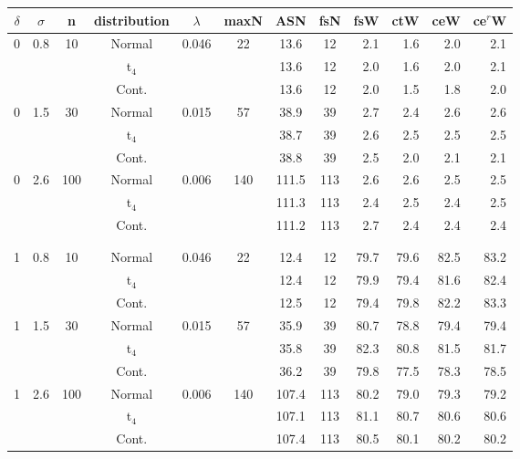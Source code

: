 \begin{tabular}{ccccccccrrrr}

\toprule
\multicolumn{1}{c}{$\delta$}&\multicolumn{1}{c}{$\sigma$}&\multicolumn{1}{c}{n}&\multicolumn{1}{c}{distribution}&\multicolumn{1}{c}{$\lambda$}&\multicolumn{1}{c}{maxN}&\multicolumn{1}{c}{ASN}&\multicolumn{1}{c}{fsN}&\multicolumn{1}{r}{fsW}&\multicolumn{1}{r}{ctW}&\multicolumn{1}{r}{ceW}&\multicolumn{1}{r}{ce$^r$W}\\
\midrule
0  &  0.8  &   10  &  Normal  &  0.046  &   22  &  13.6  &   12  &  2.1  &  1.6  &  2.0  &  2.1\\
   &     &     &  t$_4$  &     &     &  13.6  &   12  &  2.0  &  1.6  &  2.0  &  2.1\\
   &     &     &  Cont.  &     &     &  13.6  &   12  &  2.0  &  1.5  &  1.8  &  2.0\\
0  &  1.5  &   30  &  Normal  &  0.015  &   57  &  38.9  &   39  &  2.7  &  2.4  &  2.6  &  2.6\\
   &     &     &  t$_4$  &     &     &  38.7  &   39  &  2.6  &  2.5  &  2.5  &  2.5\\
   &     &     &  Cont.  &     &     &  38.8  &   39  &  2.5  &  2.0  &  2.1  &  2.1\\
0  &  2.6  &  100  &  Normal  &  0.006  &  140  &  111.5  &  113  &  2.6  &  2.6  &  2.5  &  2.5\\
   &     &     &  t$_4$  &     &     &  111.3  &  113  &  2.4  &  2.5  &  2.4  &  2.5\\
   &     &     &  Cont.  &     &     &  111.2  &  113  &  2.7  &  2.4  &  2.4  &  2.4\\
\\\hline\\ 1  &  0.8  &   10  &  Normal  &  0.046  &   22  &  12.4  &   12  &  79.7  &  79.6  &  82.5  &  83.2\\
   &     &     &  t$_4$  &     &     &  12.4  &   12  &  79.9  &  79.4  &  81.6  &  82.4\\
   &     &     &  Cont.  &     &     &  12.5  &   12  &  79.4  &  79.8  &  82.2  &  83.3\\
1  &  1.5  &   30  &  Normal  &  0.015  &   57  &  35.9  &   39  &  80.7  &  78.8  &  79.4  &  79.4\\
   &     &     &  t$_4$  &     &     &  35.8  &   39  &  82.3  &  80.8  &  81.5  &  81.7\\
   &     &     &  Cont.  &     &     &  36.2  &   39  &  79.8  &  77.5  &  78.3  &  78.5\\
1  &  2.6  &  100  &  Normal  &  0.006  &  140  &  107.4  &  113  &  80.2  &  79.0  &  79.3  &  79.2\\
   &     &     &  t$_4$  &     &     &  107.1  &  113  &  81.1  &  80.7  &  80.6  &  80.6\\
   &     &     &  Cont.  &     &     &  107.4  &  113  &  80.5  &  80.1  &  80.2  &  80.2\\
\bottomrule

\end{tabular}
